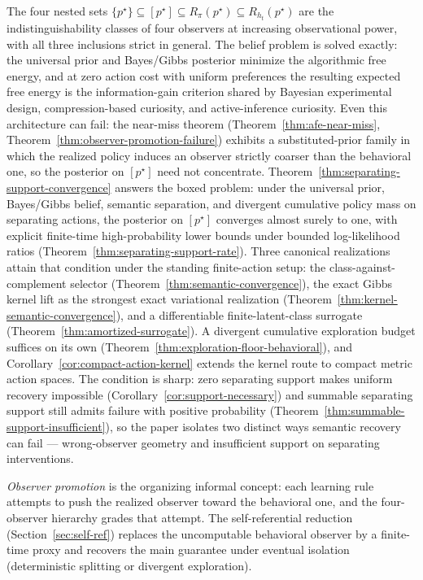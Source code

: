 \documentclass[11pt]{article}
\theoremstyle{definition}
\theoremstyle{remark}
\begin{document}
The four nested sets $\{p^\star\}\subseteq[p^\star]\subseteq R_\pi(p^\star)\subseteq R_{h_t}(p^\star)$ are the indistinguishability classes of four observers at increasing observational power, with all three inclusions strict in general. The belief problem is solved exactly: the universal prior and Bayes/Gibbs posterior minimize the algorithmic free energy, and at zero action cost with uniform preferences the resulting expected free energy is the information-gain criterion shared by Bayesian experimental design, compression-based curiosity, and active-inference curiosity. Even this architecture can fail: the near-miss theorem (Theorem~\ref{thm:afe-near-miss}, Theorem~\ref{thm:observer-promotion-failure}) exhibits a substituted-prior family in which the realized policy induces an observer strictly coarser than the behavioral one, so the posterior on $[p^\star]$ need not concentrate. Theorem~\ref{thm:separating-support-convergence} answers the boxed problem: under the universal prior, Bayes/Gibbs belief, semantic separation, and divergent cumulative policy mass on separating actions, the posterior on $[p^\star]$ converges almost surely to one, with explicit finite-time high-probability lower bounds under bounded log-likelihood ratios (Theorem~\ref{thm:separating-support-rate}). Three canonical realizations attain that condition under the standing finite-action setup: the class-against-complement selector (Theorem~\ref{thm:semantic-convergence}), the exact Gibbs kernel lift as the strongest exact variational realization (Theorem~\ref{thm:kernel-semantic-convergence}), and a differentiable finite-latent-class surrogate (Theorem~\ref{thm:amortized-surrogate}). A divergent cumulative exploration budget suffices on its own (Theorem~\ref{thm:exploration-floor-behavioral}), and Corollary~\ref{cor:compact-action-kernel} extends the kernel route to compact metric action spaces. The condition is sharp: zero separating support makes uniform recovery impossible (Corollary~\ref{cor:support-necessary}) and summable separating support still admits failure with positive probability (Theorem~\ref{thm:summable-support-insufficient}), so the paper isolates two distinct ways semantic recovery can fail --- wrong-observer geometry and insufficient support on separating interventions.

\emph{Observer promotion} is the organizing informal concept: each learning rule attempts to push the realized observer toward the behavioral one, and the four-observer hierarchy grades that attempt. The self-referential reduction (Section~\ref{sec:self-ref}) replaces the uncomputable behavioral observer by a finite-time proxy and recovers the main guarantee under eventual isolation (deterministic splitting or divergent exploration).
\end{document}
